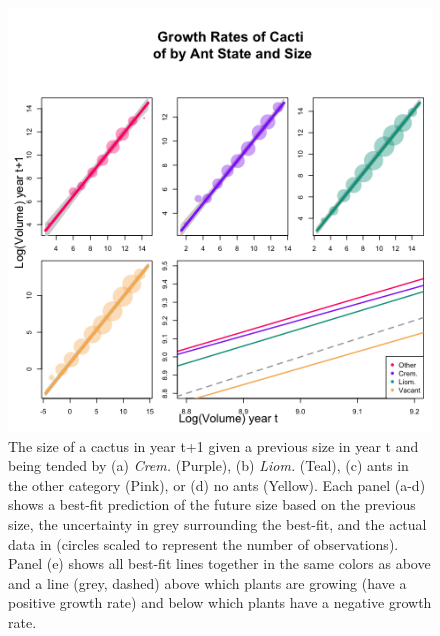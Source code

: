 \documentclass[12pt,a4paper]{article}
\begin{document}
	\begin{figure}[!ht]
	    \centering
	    \includegraphics{Figures/grow_panel.png}
	    \caption{The size of a cactus in year t+1 given a previous size in year t and being tended by (a) \textit{Crem.} (Purple), (b) \textit{Liom.} (Teal), (c) ants in the other category (Pink), or (d) no ants (Yellow). Each panel (a-d) shows a best-fit prediction of the future size based on the previous size, the uncertainty in grey surrounding the best-fit, and the actual data in (circles scaled to represent the number of observations). Panel (e) shows all best-fit lines together in the same colors as above and a line (grey, dashed) above which plants are growing (have a positive growth rate) and below which plants have a negative growth rate.}
	    \label{fig:grow}
	\end{figure}
	
\end{document}
